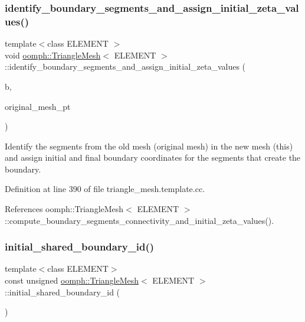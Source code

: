 \subsubsection{\texorpdfstring{identify\+\_\+boundary\+\_\+segments\+\_\+and\+\_\+assign\+\_\+initial\+\_\+zeta\+\_\+values()}{identify\_boundary\_segments\_and\_assign\_initial\_zeta\_values()}\hspace{0.1cm}{\footnotesize\ttfamily [2/2]}}
{\footnotesize\ttfamily template$<$class E\+L\+E\+M\+E\+NT $>$ \\
void \hyperlink{classoomph_1_1TriangleMesh}{oomph\+::\+Triangle\+Mesh}$<$ E\+L\+E\+M\+E\+NT $>$\+::identify\+\_\+boundary\+\_\+segments\+\_\+and\+\_\+assign\+\_\+initial\+\_\+zeta\+\_\+values (\begin{DoxyParamCaption}\item[{const unsigned \&}]{b,  }\item[{\hyperlink{classoomph_1_1TriangleMesh}{Triangle\+Mesh}$<$ E\+L\+E\+M\+E\+NT $>$ $\ast$}]{original\+\_\+mesh\+\_\+pt }\end{DoxyParamCaption})}



Identify the segments from the old mesh (original mesh) in the new mesh (this) and assign initial and final boundary coordinates for the segments that create the boundary. 



Definition at line 390 of file triangle\+\_\+mesh.\+template.\+cc.



References oomph\+::\+Triangle\+Mesh$<$ E\+L\+E\+M\+E\+N\+T $>$\+::compute\+\_\+boundary\+\_\+segments\+\_\+connectivity\+\_\+and\+\_\+initial\+\_\+zeta\+\_\+values().

\mbox{\label{classoomph_1_1TriangleMesh_a27de848116b11c6fdd3dde35dcd0ca54}} 
\subsubsection{\texorpdfstring{initial\+\_\+shared\+\_\+boundary\+\_\+id()}{initial\_shared\_boundary\_id()}}
{\footnotesize\ttfamily template$<$class E\+L\+E\+M\+E\+NT$>$ \\
const unsigned \hyperlink{classoomph_1_1TriangleMesh}{oomph\+::\+Triangle\+Mesh}$<$ E\+L\+E\+M\+E\+NT $>$\+::initial\+\_\+shared\+\_\+boundary\+\_\+id (\begin{DoxyParamCaption}{ }\end{DoxyParamCaption})\hspace{0.3cm}{\ttfamily [inline]}}



